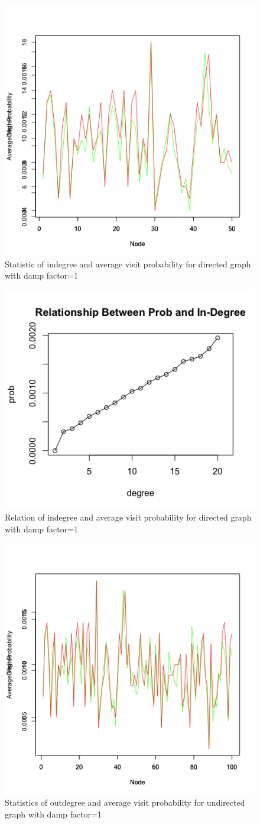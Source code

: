 \documentclass{article}
\begin{document}
\begin{figure}[htbp]
\centering
\includegraphics[width=.6\textwidth]{p3_3.png}
\caption{Statistic of indegree and average visit probability for directed graph with damp factor=1}
\label{fig:p3_3}
\end{figure}
\begin{figure}[htbp]
\centering
\includegraphics[width=.6\textwidth]{p3_4.png}
\caption{Relation of indegree and average visit probability for directed graph with damp factor=1}
\label{fig:p3_4}
\end{figure}
\begin{figure}[htbp]
\centering
\includegraphics[width=.6\textwidth]{p3_7.png}
\caption{Statistics of outdegree and average visit probability for undirected graph with damp factor=1}
\label{fig:p3_7}
\end{figure}
\end{document}
